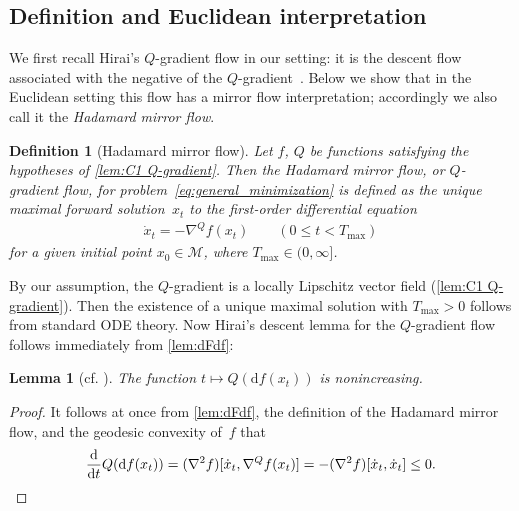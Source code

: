 \documentclass[11pt,letterpaper]{article}
\newtheorem{definition}[theorem]{Definition}\AddToHook{env/definition/begin}{\crefalias{theorem}{definition}}
\newtheorem{lemma}[theorem]{Lemma}\AddToHook{env/lemma/begin}{\crefalias{theorem}{lemma}}
\numberwithin{equation}{section}
\newcommand{\diff}{\mathrm{d}}
\newcommand{\MM}{\mathcal{M}}
\begin{document}
\subsection{Definition and Euclidean interpretation}\label{sub:flow and euclidean}
We first recall Hirai's $Q$-gradient flow in our setting:
it is the descent flow associated with the negative of the $Q$-gradient~\cite{Hirai2025}.
Below we show that in the Euclidean setting this flow has a mirror flow interpretation;
accordingly we also call it the \emph{Hadamard mirror flow}.

\begin{definition}[Hadamard mirror flow]\label{def:mirror flow}
Let $f$, $Q$ be functions satisfying the hypotheses of \cref{lem:C1 Q-gradient}.
Then the \emph{Hadamard mirror flow}, or $Q$-gradient flow, for problem~\eqref{eq:general_minimization} is defined as the unique maximal forward solution~$x_t$ to the first-order differential equation
\begin{align}\label{eqn:q-gradientflow}
    \dot x_t = -\nabla^Q f(x_t) \qquad (0 \leq t < T_{\max}) %
\end{align}
for a given initial point $x_0 \in \MM$, where $T_{\max} \in (0,\infty]$.
\end{definition}

By our assumption, the $Q$-gradient is a locally Lipschitz vector field (\cref{lem:C1 Q-gradient}).
Then the existence of a unique maximal solution with $T_{\max}>0$ follows from standard ODE theory.
Now Hirai's descent lemma for the $Q$-gradient flow follows immediately from \cref{lem:dFdf}:

\begin{lemma}[{cf. \cite[Lem.~3.9]{Hirai2025}}]\label{lem:descentHirai}
    The function $t \mapsto Q(\diff f(x_t))$ is nonincreasing.
\end{lemma}
\begin{proof}
It follows at once from \cref{lem:dFdf}, the definition of the Hadamard mirror flow, and the geodesic convexity of~$f$ that
\begin{equation*}
    \frac{\diff}{\diff t} Q(\diff f(x_t))
=   (\nabla^2 f)[\dot x_t, \nabla^Q f(x_t)]
=  -(\nabla^2 f)[\dot x_t, \dot x_t]
\leq 0.
\qedhere
\end{equation*}
\end{proof}
\end{document}

